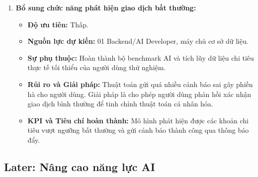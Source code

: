 \begin{enumerate}
    \item \textbf{Bổ sung chức năng phát hiện giao dịch bất thường:}
    \begin{itemize}
        \item \textbf{Độ ưu tiên:} Thấp.
        \item \textbf{Nguồn lực dự kiến:} 01 Backend/AI Developer, máy chủ cơ sở dữ liệu.
        \item \textbf{Sự phụ thuộc:} Hoàn thành bộ benchmark AI và tích lũy dữ liệu chi tiêu thực tế tối thiểu của người dùng thử nghiệm.
        \item \textbf{Rủi ro và Giải pháp:} Thuật toán gửi quá nhiều cảnh báo sai gây phiền hà cho người dùng. Giải pháp là cho phép người dùng phản hồi xác nhận giao dịch bình thường để tinh chỉnh thuật toán cá nhân hóa.
        \item \textbf{KPI và Tiêu chí hoàn thành:} Mô hình phát hiện được các khoản chi tiêu vượt ngưỡng bất thường và gửi cảnh báo thành công qua thông báo đẩy.
    \end{itemize}
\end{enumerate}

\subsection{Later: Nâng cao năng lực AI}

